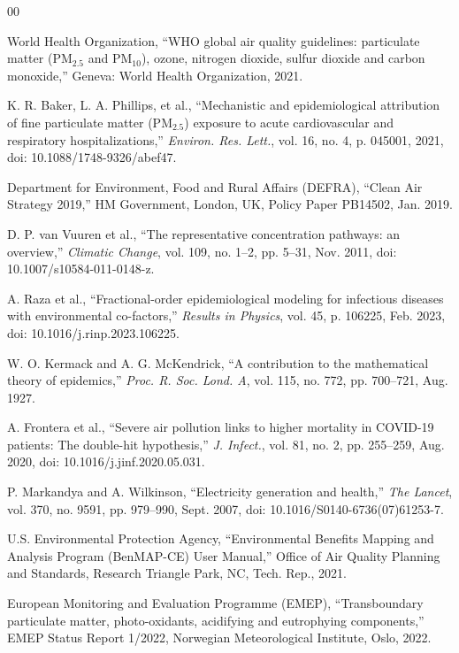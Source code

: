 \documentclass[conference]{IEEEtran}
\renewcommand{\_}{\textunderscore\allowbreak{}}%
\begin{document}
\begin{thebibliography}{00}

World Health Organization, ``WHO global air quality guidelines: particulate matter ($\text{PM}_{2.5}$ and $\text{PM}_{10}$), ozone, nitrogen dioxide, sulfur dioxide and carbon monoxide,'' Geneva: World Health Organization, 2021.

K. R. Baker, L. A. Phillips, et al., ``Mechanistic and epidemiological attribution of fine particulate matter ($\text{PM}_{2.5}$) exposure to acute cardiovascular and respiratory hospitalizations,'' \textit{Environ. Res. Lett.}, vol. 16, no. 4, p. 045001, 2021, doi: 10.1088/1748-9326/abef47.

Department for Environment, Food and Rural Affairs (DEFRA), ``Clean Air Strategy 2019,'' HM Government, London, UK, Policy Paper PB14502, Jan. 2019.

D. P. van Vuuren et al., ``The representative concentration pathways: an overview,'' \textit{Climatic Change}, vol. 109, no. 1--2, pp. 5--31, Nov. 2011, doi: 10.1007/s10584-011-0148-z.

A. Raza et al., ``Fractional-order epidemiological modeling for infectious diseases with environmental co-factors,'' \textit{Results in Physics}, vol. 45, p. 106225, Feb. 2023, doi: 10.1016/j.rinp.2023.106225.

W. O. Kermack and A. G. McKendrick, ``A contribution to the mathematical theory of epidemics,'' \textit{Proc. R. Soc. Lond. A}, vol. 115, no. 772, pp. 700--721, Aug. 1927.

A. Frontera et al., ``Severe air pollution links to higher mortality in COVID-19 patients: The double-hit hypothesis,'' \textit{J. Infect.}, vol. 81, no. 2, pp. 255--259, Aug. 2020, doi: 10.1016/j.jinf.2020.05.031.

P. Markandya and A. Wilkinson, ``Electricity generation and health,'' \textit{The Lancet}, vol. 370, no. 9591, pp. 979--990, Sept. 2007, doi: 10.1016/S0140-6736(07)61253-7.

U.S. Environmental Protection Agency, ``Environmental Benefits Mapping and Analysis Program (BenMAP-CE) User Manual,'' Office of Air Quality Planning and Standards, Research Triangle Park, NC, Tech. Rep., 2021.

European Monitoring and Evaluation Programme (EMEP), ``Transboundary particulate matter, photo-oxidants, acidifying and eutrophying components,'' EMEP Status Report 1/2022, Norwegian Meteorological Institute, Oslo, 2022.


\end{thebibliography}
\end{document}

